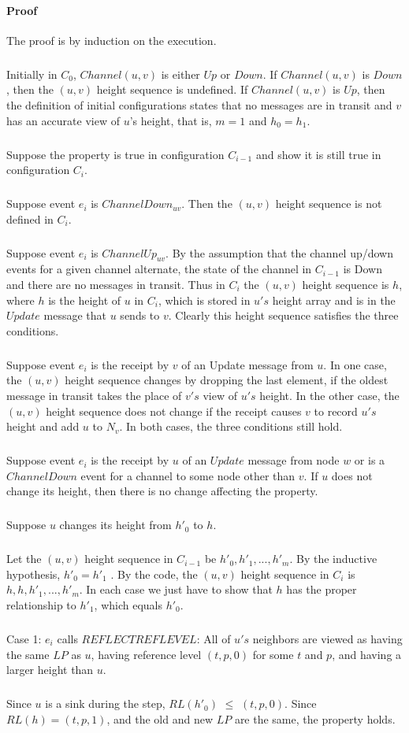 \paragraph{Proof}The proof is by induction on the execution.
\subparagraph{}Initially in $C_0$, $Channel(u, v)$ is either $Up$ or $Down$. If $Channel(u, v)$ is $Down$, then the $(u, v)$ height sequence is undefined. If $Channel(u, v)$ is $Up$, then the definition of initial configurations states that no messages are in transit and $v$ has an accurate view of $u$'s height, that is, $m = 1$ and $h_0 = h_1$.
\subparagraph{}Suppose the property is true in configuration $C_{i-1}$ and show it is still true in configuration $C_i$.
\subparagraph{}Suppose event $e_i$ is $ChannelDown_{uv}$. Then the $(u, v)$ height sequence is not defined in $C_i$.
\subparagraph{}Suppose event $e_i$ is $ChannelUp_{uv}$. By the assumption that the channel up/down events for a given channel alternate, the state of the channel in $C_{i-1}$ is Down and there are no messages in transit. Thus in $C_i$ the $(u, v)$ height sequence is $h$, where $h$ is the height of $u$ in $C_i$, which is stored in $u's$ height array and is in the $Update$ message that $u$ sends to $v$. Clearly this height sequence satisfies the three conditions.
\subparagraph{}Suppose event $e_i$ is the receipt by $v$ of an Update message from $u$. In one case, the $(u, v)$ height sequence changes by dropping the last element, if the oldest message in transit takes the place of $v's$ view of $u's$ height. In the other case, the $(u, v)$ height sequence does not change if the receipt causes $v$ to record $u's$ height and add $u$ to $N_v$. In both cases, the three conditions still hold.
\subparagraph{}Suppose event $e_i$ is the receipt by $u$ of an $Update$ message from node $w$ or is a $ChannelDown$ event for a channel to some node other than $v$. If $u$ does not change its height, then there is no change affecting the property.
\subparagraph{}Suppose $u$ changes its height from $h' _0$ to $h$.
\subparagraph{}Let the $(u, v)$ height sequence in $C_{i-1}$ be $h' _0 , h'_1, ... , h'_m$. By the inductive hypothesis, $h' _0 = h' _1$ . By the code, the $(u, v)$ height sequence in $C_i$ is $h, h, h'_1 , ... , h'_m$. In each case we just have to show that $h$ has the proper relationship to $h'_1$, which equals $h'_0$.
\subparagraph{}Case 1: $e_i$ calls $REFLECTREFLEVEL$: All of $u's$ neighbors are viewed as having the same $LP$ as $u$, having reference level $(t, p, 0)$ for some $t$ and $p$, and having a larger height than $u$.
\subparagraph{}Since $u$ is a sink during the step, $RL(h'_0 )$ $\leq$ $(t, p, 0)$. Since $RL(h) = (t, p, 1)$, and the old and new $LP$ are the same, the property holds.
